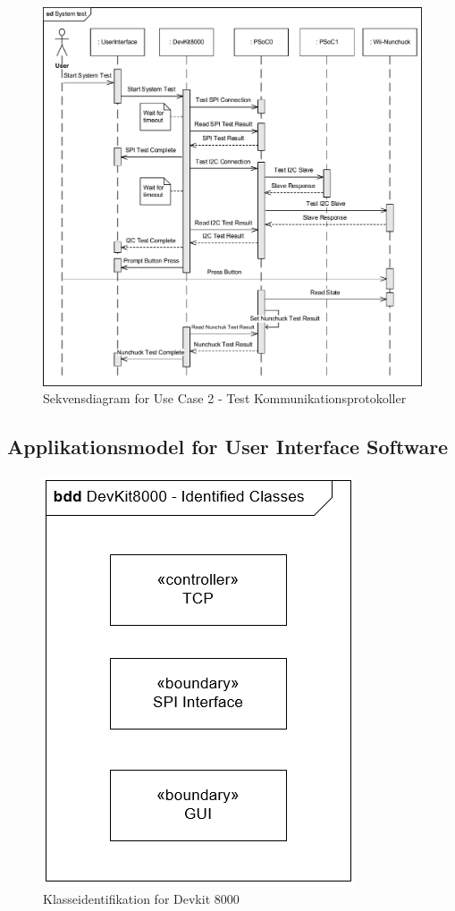 \begin{figure}[H]
	\centering
	\includegraphics[width=\textwidth]{Systemarkitektur/images/OverordnetSekvensDiagramSystemTest}
	\caption{Sekvensdiagram for Use Case 2 - Test Kommunikationsprotokoller}
	\label{fig:SystemTestOverviewSequenceDiagram}
\end{figure}

\subsection{Applikationsmodel for User Interface Software}

\begin{figure}[H]
	\centering
	\includegraphics[scale=0.8]{Systemarkitektur/images/KlasseIdentifikationDevKit.png}
	\caption{Klasseidentifikation for Devkit 8000}
	\label{fig:klasseidentifikationDevKit}
\end{figure}

